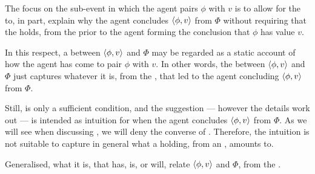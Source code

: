 \begin{note}
  The focus on the sub-event in which the agent pairs \(\phi\) with \(v\) is to allow for the \ros{} to, in part, explain why the agent concludes \(\langle \phi, v \rangle\) from \(\Phi\) without requiring that the \ros{} holds, from the \agpe{} prior to the agent forming the conclusion that \(\phi\) has value \(v\).

  In this respect, a \ros{} between \(\langle \phi, v \rangle\) and \(\Phi\) may be regarded as a static account of how the agent has come to pair \(\phi\) with \(v\).
  In other words, the \ros{} between \(\langle \phi, v \rangle\) and \(\Phi\) just captures whatever it is, from the \agpe{}, that led to the agent concluding \(\langle \phi, v \rangle\) from \(\Phi\).

  Still, \supportI{} is only a sufficient condition, and the suggestion --- however the details work out --- is intended as intuition for when the agent concludes \(\langle \phi, v \rangle\) from \(\Phi\).
  As we will see when discussing \supportII{}, we will deny the converse of \supportI{}.
  Therefore, the intuition is not suitable to capture in general what a \ros{} holding, from an \agpe{}, amounts to.

  Generalised, what it is, that has, is, or will, relate \(\langle \phi, v \rangle\) and \(\Phi\), from the \agpe{}.
\end{note}

